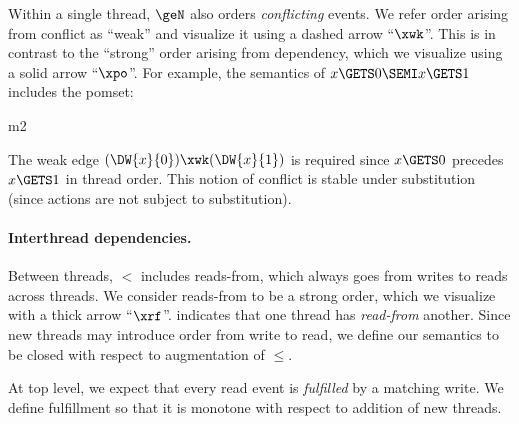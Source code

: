 Within a single thread, $\geN$ also orders \emph{conflicting} events.  We
refer order arising from conflict as ``weak'' and visualize it using a dashed
arrow ``$\xwk$''.  This is in contrast to the ``strong'' order arising from dependency,
which we visualize using a solid arrow ``$\xpo$''.  For example, the semantics of
\begin{math}
  x\GETS 0\SEMI
  x\GETS 1
\end{math}
includes the pomset:
\begin{tikzdisplaylabel}[node distance=1em]{m2}
\end{tikzdisplaylabel}
The weak edge $(\DW{x}{0})\xwk(\DW{x}{1})$ is required since $x\GETS 0$
precedes $x\GETS 1$ in thread order.  This notion of conflict is stable under
substitution (since actions are not subject to substitution).


\paragraph{Interthread dependencies.}
Between threads, $\lt$ includes reads-from, which always goes from writes to reads across threads.   We consider reads-from to be a strong order, which we visualize
with a thick arrow ``$\xrf$''.  indicates that one thread has \emph{read-from}
another.  Since new threads may introduce order from
write to read, we define our semantics to be closed with respect to
augmentation of $\le$.

At top level, we expect that every read event is \emph{fulfilled} by a
matching write.  We define fulfillment %
so that it is monotone with respect to addition of new threads.  


